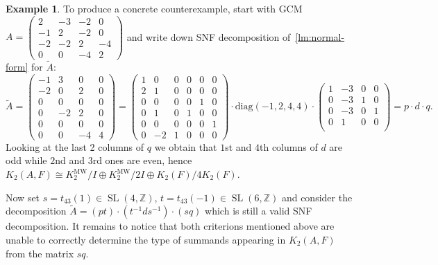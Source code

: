 \documentclass[oneside, 10pt]{amsart}
\theoremstyle{plain}
\theoremstyle{remark}
\theoremstyle{definition}
\newtheorem{example}{Example} \Crefname{example}{Example}{Examples}
\DeclareMathOperator{\SL}{SL}
\newcommand{\ZZ}{\mathbb{Z}}
\newcommand{\K}{K_2}
\newcommand{\Kmw}{K^{\mathrm{MW}}_2}
\begin{document}
\begin{example}
To produce a concrete counterexample, start with GCM 
 $A = \left(\begin{smallmatrix}
 2& -3& -2& 0\\
-1& 2& -2& 0\\
-2& -2& 2& -4\\
0& 0& -4& 2\end{smallmatrix}\right)$
  and write down SNF decomposition of~\cref{lm:normal-form} for $\widetilde{A}$:
\[\widetilde{A} = \left(\begin{smallmatrix}
-1& 3& 0& 0\\
-2& 0& 2& 0\\
0& 0& 0& 0\\
0& -2& 2& 0\\
0& 0& 0& 0\\
0& 0& -4& 4
\end{smallmatrix} \right) = \left(\begin{smallmatrix}
1& 0& 0& 0& 0& 0\\
2& 1& 0& 0& 0& 0\\
0& 0& 0& 0& 1& 0\\
0& 1& 0& 1& 0& 0\\
0& 0& 0& 0& 0& 1\\
0& -2& 1& 0& 0& 0\end{smallmatrix}\right) \cdot \mathrm{diag}(-1,2,4,4) \cdot \left(\begin{smallmatrix}
1& -3& 0& 0\\
0& -3& 1& 0\\
0& -3& 0& 1\\
0& 1& 0& 0\\ \end{smallmatrix}\right) = p \cdot d \cdot q.\]
Looking at the last 2 columns of $q$ we obtain that $1$st and $4$th columns of $d$ are odd while $2$nd and $3$rd ones are even,
 hence $\K(A, F) \cong \Kmw/I \oplus \Kmw/2I \oplus \K(F)/4\K(F)$.

Now set $s = t_{43}(1) \in \SL(4, \ZZ)$, $t = t_{43}(-1) \in \SL(6, \ZZ)$ and consider the decomposition 
$\widetilde{A} = (p t) \cdot (t^{-1} d s^{-1}) \cdot (s q)$ which is still a valid SNF decomposition.
It remains to notice that both criterions mentioned above are unable to correctly determine the 
 type of summands appearing in $\K(A, F)$ from the matrix $sq$.
\end{example}

\printbibliography
\end{document}
